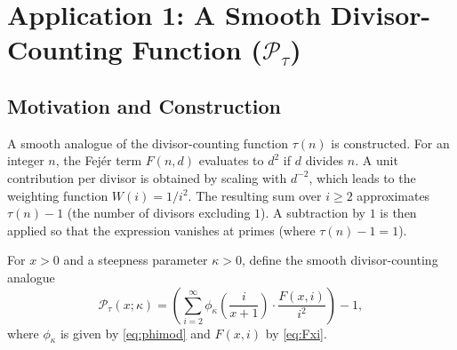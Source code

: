 \section{Application 1: A Smooth Divisor-Counting Function (\texorpdfstring{$\mathcal{P}_{\tau}$}{P_tau})}

\subsection{Motivation and Construction}
A smooth analogue of the divisor-counting function $\tau(n)$ is constructed. For an integer $n$, the Fejér term $F(n,d)$ evaluates to $d^2$ if $d$ divides $n$. A unit contribution per divisor is obtained by scaling with $d^{-2}$, which leads to the weighting function $W(i)=1/i^2$. The resulting sum over $i \ge 2$ approximates $\tau(n)-1$ (the number of divisors excluding $1$). A subtraction by $1$ is then applied so that the expression vanishes at primes (where $\tau(n)-1=1$).

\begin{definition}
For $x>0$ and a steepness parameter $\kappa>0$, define the smooth divisor-counting analogue
\begin{equation}\label{eq:Ptau}
\mathcal{P}_{\tau}(x; \kappa) = \left( \sum_{i=2}^{\infty} \phi_{\kappa}\!\left(\frac{i}{x+1}\right) \cdot \frac{F(x,i)}{i^2} \right) - 1,
\end{equation}
where $\phi_{\kappa}$ is given by \eqref{eq:phimod} and $F(x,i)$ by \eqref{eq:Fxi}.
\end{definition}

